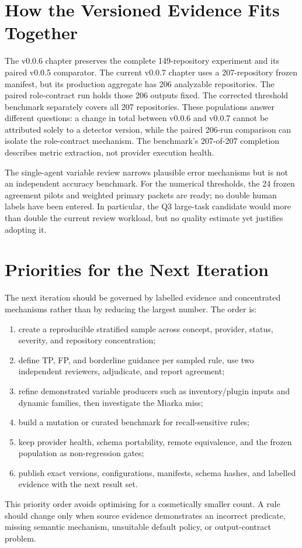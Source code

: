 \section{How the Versioned Evidence Fits Together}
The v0.0.6 chapter preserves the complete 149-repository experiment and its
paired v0.0.5 comparator. The current v0.0.7 chapter uses a 207-repository
frozen manifest, but its production aggregate has 206 analyzable repositories.
The paired role-contract run holds those 206 outputs fixed. The corrected
threshold benchmark separately covers all 207 repositories. These populations
answer different questions: a change in total between v0.0.6 and v0.0.7
cannot be attributed solely to a detector version, while the paired 206-run
comparison can isolate the role-contract mechanism. The benchmark's 207-of-207
completion describes metric extraction, not provider execution health.

The single-agent variable review narrows plausible error mechanisms but is not
an independent accuracy benchmark. For the numerical thresholds, the 24
frozen agreement pilots and weighted primary packets are ready; no double
human labels have been entered. In particular, the Q3 large-task candidate
would more than double the current review workload, but no quality estimate
yet justifies adopting it.

\section{Priorities for the Next Iteration}
The next iteration should be governed by labelled evidence and concentrated
mechanisms rather than by reducing the largest number. The order is:
\begin{enumerate}
  \item create a reproducible stratified sample across concept, provider,
  status, severity, and repository concentration;
  \item define TP, FP, and borderline guidance per sampled rule, use two
  independent reviewers, adjudicate, and report agreement;
  \item refine demonstrated variable producers such as inventory/plugin inputs
  and dynamic  families, then investigate the Miarka miss;
  \item build a mutation or curated benchmark for recall-sensitive rules;
  \item keep provider health, schema portability, remote equivalence, and the
  frozen population as non-regression gates;
  \item publish exact versions, configurations, manifests, schema hashes, and
  labelled evidence with the next result set.
\end{enumerate}

This priority order avoids optimising for a cosmetically smaller count. A rule
should change only when source evidence demonstrates an incorrect predicate,
missing semantic mechanism, unsuitable default policy, or output-contract
problem.
